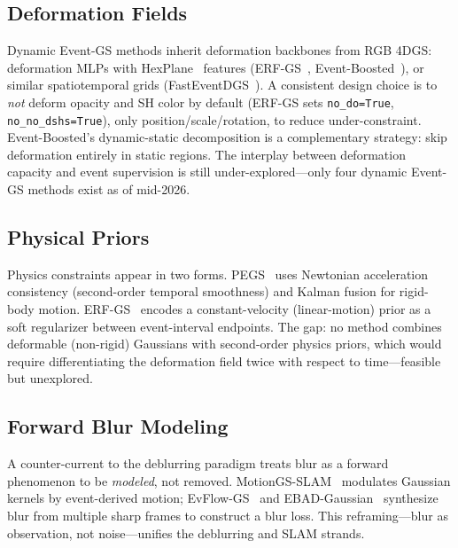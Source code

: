 \subsection{Deformation Fields}
\label{sec:cross:deformation}

Dynamic Event-GS methods inherit deformation backbones from RGB 4DGS: deformation MLPs with HexPlane~\cite{cao2023hexplane} features (ERF-GS~\cite{bai2026erfgs}, Event-Boosted~\cite{xu2025eventboosted}), or similar spatiotemporal grids (FastEventDGS~\cite{dai2026fasteventdgs}). A consistent design choice is to \emph{not} deform opacity and SH color by default (ERF-GS sets \texttt{no\_do=True}, \texttt{no\_no\_dshs=True}), only position/scale/rotation, to reduce under-constraint. Event-Boosted's dynamic-static decomposition is a complementary strategy: skip deformation entirely in static regions. The interplay between deformation capacity and event supervision is still under-explored---only four dynamic Event-GS methods exist as of mid-2026.

\subsection{Physical Priors}
\label{sec:cross:physics}

Physics constraints appear in two forms. PEGS~\cite{xu2025pegs} uses Newtonian acceleration consistency (second-order temporal smoothness) and Kalman fusion for rigid-body motion. ERF-GS~\cite{bai2026erfgs} encodes a constant-velocity (linear-motion) prior as a soft regularizer between event-interval endpoints. The gap: no method combines deformable (non-rigid) Gaussians with second-order physics priors, which would require differentiating the deformation field twice with respect to time---feasible but unexplored.

\subsection{Forward Blur Modeling}
\label{sec:cross:forwardblur}

A counter-current to the deblurring paradigm treats blur as a forward phenomenon to be \emph{modeled}, not removed. MotionGS-SLAM~\cite{hu2026motiongs} modulates Gaussian kernels by event-derived motion; EvFlow-GS~\cite{an2026evflow} and EBAD-Gaussian~\cite{deng2025ebad} synthesize blur from multiple sharp frames to construct a blur loss. This reframing---blur as observation, not noise---unifies the deblurring and SLAM strands.


